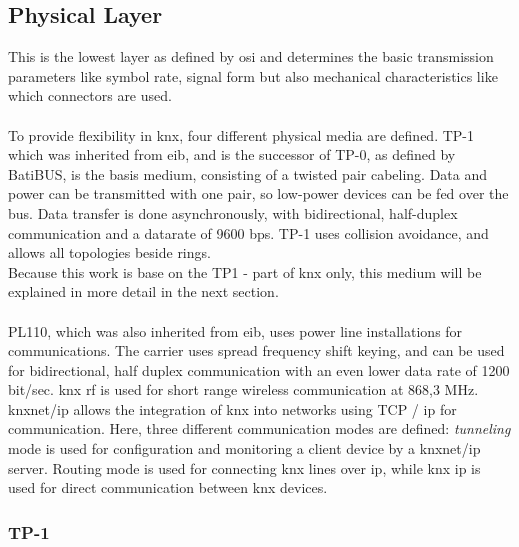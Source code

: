 \subsection{Physical Layer}
This is the lowest layer as defined by \gls{osi} and determines the basic transmission parameters like symbol rate, signal form but also mechanical 
characteristics like which connectors are used.
\\
\\
To provide flexibility in \gls{knx}, four different physical media are defined. \gls{TP}-1 which was inherited from \gls{eib}, and is the successor of \gls{TP}-0,
as defined by BatiBUS, is the basis medium, consisting of a twisted pair cabeling. Data and power can be transmitted with one pair, so low-power
devices can be fed over the bus. Data transfer is done asynchronously, with bidirectional, half-duplex
communication and a datarate of 9600 \gls{bps}. \gls{TP}-1 uses collision avoidance, and allows all topologies beside rings. 
\\
Because this work is base on the \gls{TP}1 - part of \gls{knx} only, this medium will be explained in more detail in the next section.
\\
\\
PL110, which was also inherited from \gls{eib}, uses power line installations for communications. The carrier uses spread frequency shift keying, and can be used 
for bidirectional, half duplex  communication with an even lower data rate of 1200 bit/sec. \gls{knx} \gls{rf} is used for short range wireless communication
at 868,3 MHz. \gls{knx}net/\gls{ip} allows the integration of \gls{knx} into networks using \gls{TCP} / \gls{ip} for communication. Here, three different communication
modes are defined: \textit{tunneling} mode is used for configuration and monitoring a client device by a \gls{knx}net/\gls{ip} server. Routing mode is used
for connecting \gls{knx} lines over \gls{ip}, while \gls{knx} \gls{ip} is used for direct communication between \gls{knx} devices. \cite{KraInnosec2013}

\subsubsection{TP-1}

